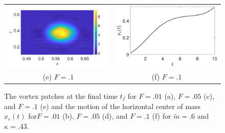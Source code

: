 \documentclass[a4paper,11pt]{article}
\begin{document}
\begin{figure}
\begin{tabular}{cc}
 \includegraphics[width=.45\textwidth]{vorticity_wm_10_modu_pt6} & \includegraphics[width=.45\textwidth]{com_wm_10_modu_pt6}\\
(e) $F=.1$ & (f) $F=.1$
\end{tabular}
\caption{The vortex patches at the final time $t_{f}$ for $F=.01$ (a), $F=.05$ (c), and $F=.1$ (e) and the motion of the horizontal center of mass $x_{c}(t)$ for$F=.01$ (b), $F=.05$ (d), and $F=.1$ (f) for $\tilde{m}=.6$ and $\kappa = .43$.}
\label{fig:midsolvorticity}
\end{figure}

\end{document}
